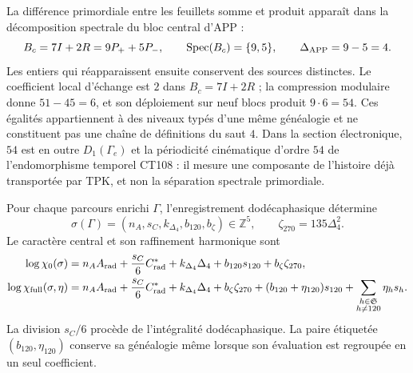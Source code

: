 La différence primordiale entre les feuillets somme et produit apparaît dans la
décomposition spectrale du bloc central d'APP :
\begin{equation}
 B_c=7I+2R=9P_++5P_-,\qquad
 \operatorname{Spec}(B_c)=\{9,5\},\qquad
 \Delta_{\rm APP}=9-5=4.
 \label{eq:salto-app-cuatro-ley-masas}
\end{equation}
Les entiers qui réapparaissent ensuite conservent des sources distinctes. Le coefficient
local d'échange est \(2\) dans \(B_c=7I+2R\) ; la compression modulaire donne
\(51-45=6\), et son déploiement sur neuf blocs produit \(9\cdot6=54\). Ces
égalités appartiennent à des niveaux typés d'une même généalogie et ne constituent pas
une chaîne de définitions du saut \(4\). Dans la section électronique, \(54\) est
en outre \(D_1(\Gamma_e)\) et la périodicité cinématique d'ordre \(54\) de
l'endomorphisme temporel CT108 : il mesure une composante de l'histoire déjà transportée
par TPK, et non la séparation spectrale primordiale.

Pour chaque parcours enrichi \(\Gamma\), l'enregistrement dodécaphasique détermine
\begin{equation}
 \sigma(\Gamma)
 =(n_A,s_C,k_{\Delta_4},b_{120},b_\zeta)\in\mathbb Z^5,
 \qquad \zeta_{270}=135\Delta_4^2.
 \label{eq:firma-z5-masas-rectoras}
\end{equation}
Le caractère central et son raffinement harmonique sont
\begin{align}
 \log\chi_0(\sigma)
 &=n_A A_{\rm rad}+\frac{s_C}{6}C^*_{\rm rad}
   +k_{\Delta_4}\Delta_4+b_{120}s_{120}+b_\zeta\zeta_{270},
 \label{eq:caracter-central-masas-rectoras}\\
 \log\chi_{\rm full}(\sigma,\eta)
 &=n_A A_{\rm rad}+\frac{s_C}{6}C^*_{\rm rad}
   +k_{\Delta_4}\Delta_4+b_\zeta\zeta_{270}
   +(b_{120}+\eta_{120})s_{120}
   +\sum_{\substack{h\in\mathfrak S\\h\ne120}}\eta_hs_h.
 \label{eq:caracter-completo-masas-rectoras}
\end{align}
La division \(s_C/6\) procède de l'intégralité dodécaphasique. La paire étiquetée
\((b_{120},\eta_{120})\) conserve sa généalogie même lorsque son évaluation est
regroupée en un seul coefficient.


